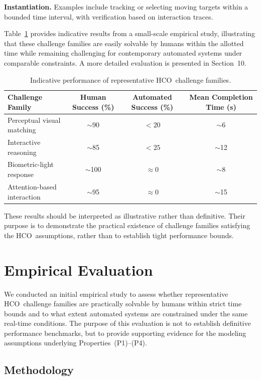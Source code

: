 \documentclass[11pt]{article}
\newcommand{\HCO}{HCO\xspace}
\begin{document}
\textbf{Instantiation.}
Examples include tracking or selecting moving targets within a bounded time interval, with verification based on interaction traces.

\medskip
Table~\ref{tab:challenge-results} provides indicative results from a small-scale empirical study, illustrating that these challenge families are easily solvable by humans within the allotted time while remaining challenging for contemporary automated systems under comparable constraints. A more detailed evaluation is presented in Section~10.

\begin{table}[t]
	\centering
	\caption{Indicative performance of representative \HCO\ challenge families.}
	\label{tab:challenge-results}
	\begin{tabular}{lccc}
		\toprule
		Challenge Family & Human Success (\%) & Automated Success (\%) & Mean Completion Time (s) \\
		\midrule
		Perceptual visual matching & $\sim$90 & $<20$ & $\sim$6 \\
		Interactive reasoning & $\sim$85 & $<25$ & $\sim$12 \\
		Biometric-light response & $\sim$100 & $\approx 0$ & $\sim$8 \\
		Attention-based interaction & $\sim$95 & $\approx 0$ & $\sim$15 \\
		\bottomrule
	\end{tabular}
\end{table}

These results should be interpreted as illustrative rather than definitive. Their purpose is to demonstrate the practical existence of challenge families satisfying the \HCO\ assumptions, rather than to establish tight performance bounds.

	
\section{Empirical Evaluation}

We conducted an initial empirical study to assess whether representative \HCO\ challenge families are practically solvable by humans within strict time bounds and to what extent automated systems are constrained under the same real-time conditions. The purpose of this evaluation is not to establish definitive performance benchmarks, but to provide supporting evidence for the modeling assumptions underlying Properties~(P1)--(P4).

\subsection{Methodology}
\end{document}
